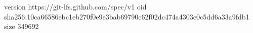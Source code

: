 version https://git-lfs.github.com/spec/v1
oid sha256:10ca66586ebc1eb270f0e9e3bab69790c62f02dc474a4303c0c5dd6a33a9fdb1
size 349692
